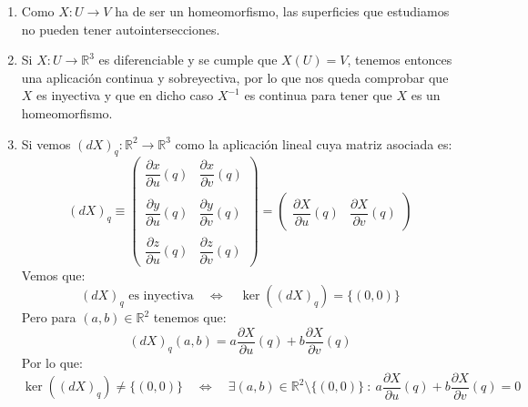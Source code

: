 \begin{observacion}
\begin{enumerate}
            Así, una superficie se obtiene juntando varios trozos de $\mathbb{R}^2$ y pegándolos juntos.
        \item Como $X:U\to V$ ha de ser un homeomorfismo, las superficies que estudiamos no pueden tener autointersecciones.
        \item Si $X:U\to\mathbb{R}^3$ es diferenciable y se cumple que $X(U) = V$, tenemos entonces una aplicación continua y sobreyectiva, por lo que nos queda comprobar que $X$ es inyectiva y que en dicho caso $X^{-1}$ es continua para tener que $X$ es un homeomorfismo.
        \item Si vemos $(dX)_q:\mathbb{R}^2\to\mathbb{R}^3$ como la aplicación lineal cuya matriz asociada es:
            \begin{equation*}
                (dX)_q \equiv \left(\begin{array}{ccc}
                    \dfrac{\partial x}{\partial u}(q) & \dfrac{\partial x}{\partial v}(q) \\
                    \\
                    \dfrac{\partial y}{\partial u}(q) & \dfrac{\partial y}{\partial v}(q) \\
                    \\
                    \dfrac{\partial z}{\partial u}(q) & \dfrac{\partial z}{\partial v}(q)  
                \end{array}\right) = 
                \left(\begin{array}{cc}
                        \dfrac{\partial X}{\partial u}(q) & \dfrac{\partial X}{\partial v}(q)
                \end{array}\right)
            \end{equation*}
            Vemos que:
            \begin{equation*}
                (dX)_q \text{\ es inyectiva} \quad\Longleftrightarrow\quad \ker((dX)_q) = \{(0,0)\}
            \end{equation*}
            Pero para $(a,b)\in \mathbb{R}^2$ tenemos que:
            \begin{equation*}
                (dX)_q(a,b) = a\frac{\partial X}{\partial u}(q) + b\frac{\partial X}{\partial v}(q)
            \end{equation*}
            Por lo que:
            \begin{equation*}
                \ker((dX)_q) \neq \{(0,0)\} \quad\Longleftrightarrow\quad \exists (a,b)\in \mathbb{R}^2\setminus \{(0,0)\} ~:~ a\frac{\partial X}{\partial u}(q) + b\frac{\partial X}{\partial v}(q) = 0

\end{equation*}
\end{enumerate}
\end{observacion}
